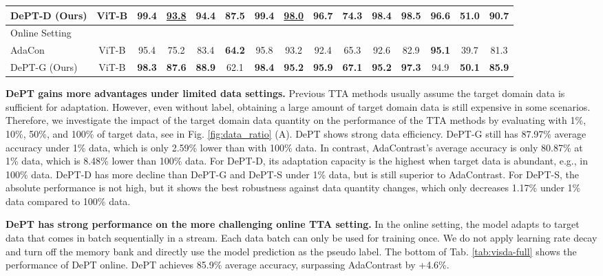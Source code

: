 \documentclass{article} \usepackage{iclr2023_conference,times}
\begin{document}
\begin{table}[t]
\begin{center}
{\begin{tabular}{l|c|cccccccccccc|c}
DePT-D (Ours)& ViT-B & 99.4 & \underline{93.8} & \bf 94.4 & \bf 87.5 & \bf 99.4 & \underline{98.0} & 96.7 & 74.3 & \bf 98.4 & 98.5 & 96.6 & 51.0 & \bf 90.7\\
\midrule \hline
\multicolumn{15}{l}{Online Setting}   \\ \hline
AdaCon & ViT-B & 95.4 & 75.2 & 83.4 & \textbf{64.2} & 95.8 & 93.2 & 92.4 & 65.3 & 92.6 & 82.9 & \textbf{95.1} & 39.7 & 81.3 \\
DePT-G (Ours) & ViT-B & \textbf{98.3} & \textbf{87.6} & \textbf{88.9} & 62.1 & \textbf{98.4} & \textbf{95.2} & \textbf{95.9} & \textbf{67.1} & \textbf{95.2} & \textbf{97.3} & 94.9 & \textbf{50.1} & \textbf{85.9}\\ \bottomrule


\end{tabular}}
\end{center}
\end{table}






\textbf{DePT gains more advantages under limited data settings.} Previous TTA methods usually assume the target domain data is sufficient for adaptation. However, even without label, obtaining a large amount of target domain data is still expensive in some scenarios. Therefore, we investigate the impact of the target domain data quantity on the performance of the TTA methods by evaluating with 1\%, 10\%, 50\%, and 100\% of target data, see in Fig. \ref{fig:data_ratio} (A). DePT shows strong data efficiency. DePT-G still has 87.97\% average accuracy under 1\% data, which is only 2.59\% lower than with 100\% data. In contrast, AdaContrast's average accuracy is only 80.87\% at 1\% data, which is 8.48\% lower than 100\% data. For DePT-D, its adaptation capacity is the highest when target data is abundant, e.g., in 100\% data. DePT-D has more decline than DePT-G and DePT-S under 1\% data, but is still superior to AdaContrast. For DePT-S, the absolute performance is not high, but it shows the best robustness against data quantity changes, which only decreases 1.17\% under 1\% data compared to 100\% data.

\textbf{DePT has strong performance on the more challenging online TTA setting.} In the online setting, the model adapts to target data that comes in batch sequentially in a stream. Each data batch can only be used for training once. We do not apply learning rate decay and turn off the memory bank and directly use the model prediction as the pseudo label. The bottom of Tab. \ref{tab:visda-full} shows the performance of DePT online. DePT achieves 85.9\% average accuracy, surpassing AdaContrast by +4.6\%. 
\end{document}
